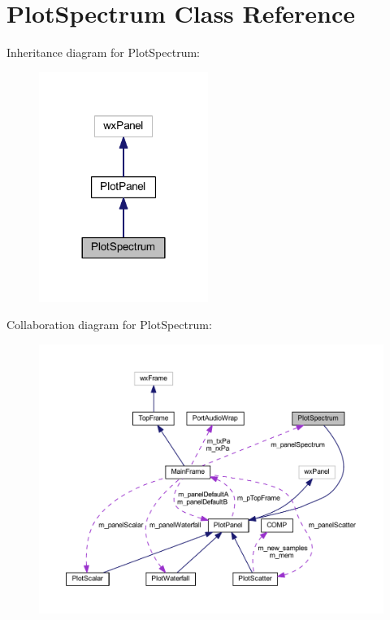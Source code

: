 \hypertarget{class_plot_spectrum}{\section{Plot\-Spectrum Class Reference}
\label{class_plot_spectrum}
}


Inheritance diagram for Plot\-Spectrum\-:
\nopagebreak
\begin{figure}[H]
\begin{center}
\leavevmode
\includegraphics[width=156pt]{class_plot_spectrum__inherit__graph}
\end{center}
\end{figure}


Collaboration diagram for Plot\-Spectrum\-:
\nopagebreak
\begin{figure}[H]
\begin{center}
\leavevmode
\includegraphics[width=350pt]{class_plot_spectrum__coll__graph}
\end{center}
\end{figure}
